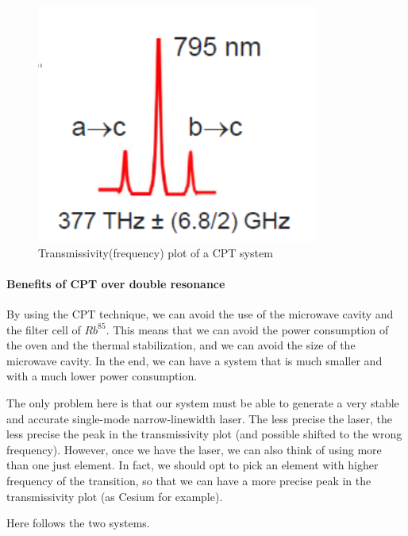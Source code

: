 \begin{figure}[H]
    \centering
    \includegraphics[width=\linewidth]{img/02.3-CPT-transmissivity-frequency}
    \caption{Transmissivity(frequency) plot of a CPT system}
    \label{fig:CPT-transmissivity-frequency}
\end{figure}

\paragraph{Benefits of CPT over double resonance}

By using the CPT technique, we can avoid the use of the microwave cavity and the filter cell of $Rb^{85}$.
This means that we can avoid the power consumption of the oven and the thermal stabilization, and we can avoid the size of the microwave cavity.
In the end, we can have a system that is much smaller and with a much lower power consumption.

The only problem here is that our system must be able to generate a very stable and accurate single-mode narrow-linewidth laser.
The less precise the laser, the less precise the peak in the transmissivity plot (and possible shifted to the wrong frequency).
However, once we have the laser, we can also think of using more than one just element.
In fact, we should opt to pick an element with higher frequency of the transition, so that we can have a more precise peak in the transmissivity plot (as Cesium for example).

Here follows the two systems.

